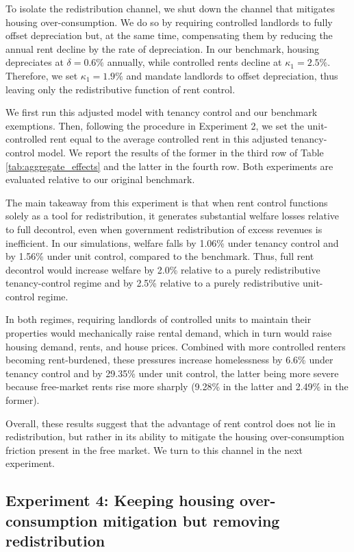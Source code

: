 \documentclass[parskip=full]{article}
\begin{document}
To isolate the redistribution channel, we shut down the channel that mitigates housing over-consumption. We do so by requiring controlled landlords to fully offset depreciation but, at the same time, compensating them by reducing the annual rent decline by the rate of depreciation. In our benchmark, housing depreciates at $\delta=0.6\%$ annually, while controlled rents decline at $\kappa_1=2.5\%$. Therefore, we set $\kappa_1=1.9\%$ and mandate landlords to offset depreciation, thus leaving only the redistributive function of rent control. 

We first run this adjusted model with tenancy control and our benchmark exemptions. Then, following the procedure in Experiment 2, we set the unit-controlled rent equal to the average controlled rent in this adjusted tenancy-control model. We report the results of the former in the third row of Table \ref{tab:aggregate_effects} and the latter in the fourth row. Both experiments are evaluated relative to our original benchmark.

The main takeaway from this experiment is that when rent control functions solely as a tool for redistribution, it generates substantial welfare losses relative to full decontrol, even when government redistribution of excess revenues is inefficient. In our simulations, welfare falls by 1.06\% under tenancy control and by 1.56\% under unit control, compared to the benchmark. Thus, full rent decontrol would increase welfare by 2.0\% relative to a purely redistributive tenancy-control regime and by 2.5\% relative to a purely redistributive unit-control regime.

In both regimes, requiring landlords of controlled units to maintain their properties would mechanically raise rental demand, which in turn would raise housing demand, rents, and house prices. Combined with more controlled renters becoming rent-burdened, these pressures increase homelessness by 6.6\% under tenancy control and by 29.35\% under unit control, the latter being more severe because free-market rents rise more sharply (9.28\% in the latter and 2.49\% in the former).

Overall, these results suggest that the advantage of rent control does not lie in redistribution, but rather in its ability to mitigate the housing over-consumption friction present in the free market. We turn to this channel in the next experiment.

\subsection{Experiment 4: Keeping housing over-consumption mitigation but removing redistribution}\label{sec:exp_4}
\end{document}
